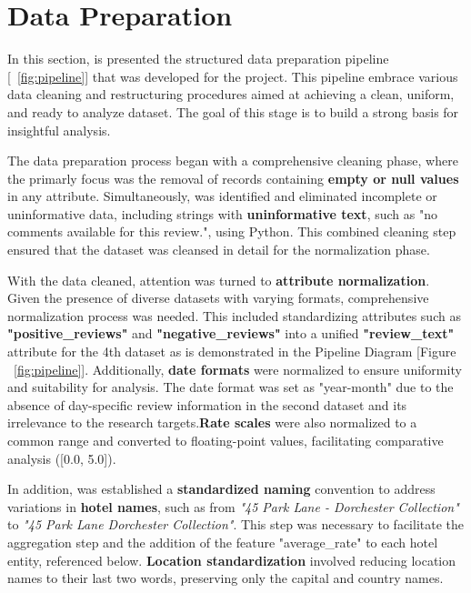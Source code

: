 \documentclass[sigconf]{acmart}
\begin{document}
\section{Data Preparation}

In this section, is presented the structured data preparation pipeline [~\ref{fig:pipeline}] that was developed for the project. This pipeline embrace various data cleaning and restructuring procedures aimed at achieving a clean, uniform, and ready to analyze dataset. The goal of this stage is to build a strong basis for insightful analysis.

The data preparation process began with a comprehensive cleaning phase, where the primarly focus was the removal of records containing \textbf{empty or null values} in any attribute. Simultaneously, was identified and eliminated incomplete or uninformative data, including strings with \textbf{uninformative text}, such as "no comments available for this review.", using Python. This combined cleaning step ensured that the dataset was cleansed in detail for the normalization phase.

With the data cleaned, attention was turned to \textbf{attribute normalization}. Given the presence of diverse datasets with varying formats, comprehensive normalization process was needed. This included standardizing attributes such as \textbf{"positive\_reviews"} and \textbf{"negative\_reviews"} into a unified \textbf{"review\_text"} attribute for the 4th dataset as is demonstrated in the Pipeline Diagram [Figure ~\ref{fig:pipeline}]. Additionally, \textbf{date formats} were normalized to ensure uniformity and suitability for analysis. The date format was set as "year-month" due to the absence of day-specific review information in the second dataset and its irrelevance to the research targets.\textbf{Rate scales} were also normalized to a common range and converted to floating-point values, facilitating comparative analysis ([0.0, 5.0]).

In addition, was established a \textbf{standardized naming} convention to address variations in \textbf{hotel names}, such as from \textit{"45 Park Lane - Dorchester Collection"} to \textit{"45 Park Lane Dorchester Collection"}. This step was necessary to facilitate the aggregation step and the addition of the feature "average\_rate" to each hotel entity, referenced below. \textbf{Location standardization} involved reducing location names to their last two words, preserving only the capital and country names.
\end{document}

